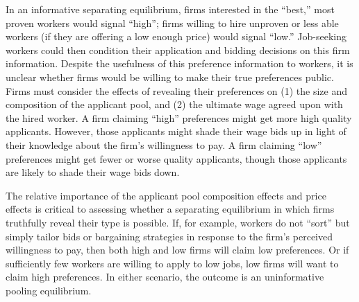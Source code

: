 In an informative separating equilibrium, firms interested in the ``best,'' most proven workers would signal ``high'';
firms willing to hire unproven or less able workers (if they are offering a low enough price) would signal ``low.''
Job-seeking workers could then condition their application and bidding decisions on this firm information. 
Despite the usefulness of this preference information to workers, it is unclear whether firms would be willing to make their true preferences public.
Firms must consider the effects of revealing their preferences  on (1) the size and composition of the applicant pool, and (2) the ultimate wage agreed upon with the hired worker.
A firm claiming  ``high'' preferences might get more high quality applicants.
However, those applicants might shade their wage bids up in light of their knowledge about the firm's willingness to pay. 
A firm claiming  ``low'' preferences might get fewer or worse quality applicants, though those applicants are likely to shade their wage bids down.

The relative importance of the applicant pool composition effects and price effects is critical to assessing whether a separating equilibrium in which firms truthfully reveal their type is possible.
If, for example, workers do not ``sort'' but simply tailor bids or bargaining strategies in response to the firm's perceived willingness to pay, then both high and low firms will claim low preferences.
Or if sufficiently few workers are willing to apply to low jobs, low firms will want to claim high preferences.
In either scenario, the outcome is an uninformative pooling equilibrium. 

